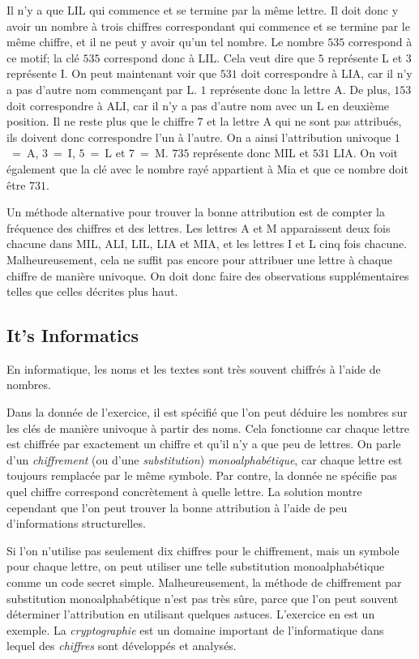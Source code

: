 \documentclass[a4paper,11pt]{report}
\begin{document}
Il n’y a que LIL qui commence et se termine par la même lettre. Il doit donc y avoir un nombre à trois chiffres correspondant qui commence et se termine par le même chiffre, et il ne peut y avoir qu’un tel nombre. Le nombre $535$ correspond à ce motif; la clé $535$ correspond donc à LIL. Cela veut dire que $5$ représente L et $3$ représente I. On peut maintenant voir que $531$ doit correspondre à LIA, car il n’y a pas d’autre nom commençant par L. $1$ représente donc la lettre A. De plus, $153$ doit correspondre à ALI, car il n’y a pas d’autre nom avec un L en deuxième position. Il ne reste plus que le chiffre $7$ et la lettre A qui ne sont pas attribués, ils doivent donc correspondre l’un à l’autre. On a ainsi l’attribution univoque $1$~=~A, $3$~=~I, $5$~=~L et $7$~=~M. $735$ représente donc MIL et $531$ LIA. On voit également que la clé avec le nombre rayé appartient à Mia et que ce nombre doit être $731$.

Un méthode alternative pour trouver la bonne attribution est de compter la fréquence des chiffres et des lettres. Les lettres A et M apparaissent deux fois chacune dans MIL, ALI, LIL, LIA et MIA, et les lettres I et L cinq fois chacune. Malheureusement, cela ne suffit pas encore pour attribuer une lettre à chaque chiffre de manière univoque. On doit donc faire des observations supplémentaires telles que celles décrites plus haut.


\subsection*{It’s Informatics}

En informatique, les noms et les textes sont très souvent chiffrés à l’aide de nombres.

Dans la donnée de l’exercice, il est spécifié que l’on peut déduire les nombres sur les clés de manière univoque à partir des noms. Cela fonctionne car chaque lettre est chiffrée par exactement un chiffre et qu’il n’y a que peu de lettres. On parle d’un \emph{chiffrement} (ou d’une \emph{substitution}) \emph{monoalphabétique}, car chaque lettre est toujours remplacée par le même symbole. Par contre, la donnée ne spécifie pas quel chiffre correspond concrètement à quelle lettre. La solution montre cependant que l’on peut trouver la bonne attribution à l’aide de peu d’informations structurelles.

Si l’on n’utilise pas seulement dix chiffres pour le chiffrement, mais un symbole pour chaque lettre, on peut utiliser une telle substitution monoalphabétique comme un code secret simple. Malheureusement, la méthode de chiffrement par substitution monoalphabétique n’est pas très sûre, parce que l’on peut souvent déterminer l’attribution en utilisant quelques astuces. L’exercice en est un exemple. La \emph{cryptographie} est un domaine important de l’informatique dans lequel des \emph{chiffres} sont développés et analysés.
\end{document}
